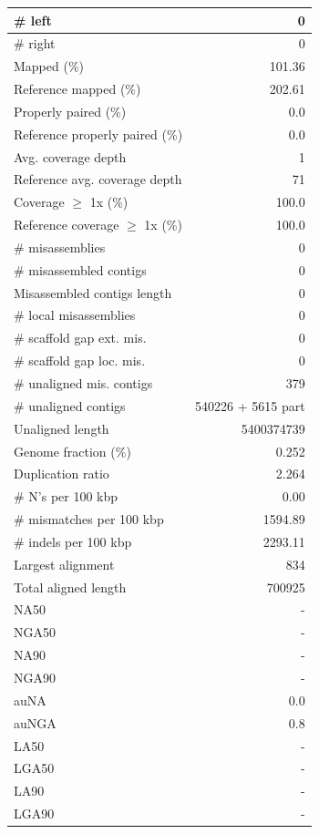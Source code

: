 \documentclass[12pt,a4paper]{article}
\begin{document}
\begin{table}[ht]
\begin{center}
\begin{tabular}{|l*{1}{|r}|}
\# left & 0 \\ \hline
\# right & 0 \\ \hline
Mapped (\%) & 101.36 \\ \hline
Reference mapped (\%) & 202.61 \\ \hline
Properly paired (\%) & 0.0 \\ \hline
Reference properly paired (\%) & 0.0 \\ \hline
Avg. coverage depth & 1 \\ \hline
Reference avg. coverage depth & 71 \\ \hline
Coverage $\geq$ 1x (\%) & 100.0 \\ \hline
Reference coverage $\geq$ 1x (\%) & 100.0 \\ \hline
\# misassemblies & 0 \\ \hline
\# misassembled contigs & 0 \\ \hline
Misassembled contigs length & 0 \\ \hline
\# local misassemblies & 0 \\ \hline
\# scaffold gap ext. mis. & 0 \\ \hline
\# scaffold gap loc. mis. & 0 \\ \hline
\# unaligned mis. contigs & 379 \\ \hline
\# unaligned contigs & 540226 + 5615 part \\ \hline
Unaligned length & 5400374739 \\ \hline
Genome fraction (\%) & 0.252 \\ \hline
Duplication ratio & 2.264 \\ \hline
\# N's per 100 kbp & 0.00 \\ \hline
\# mismatches per 100 kbp & 1594.89 \\ \hline
\# indels per 100 kbp & 2293.11 \\ \hline
Largest alignment & 834 \\ \hline
Total aligned length & 700925 \\ \hline
NA50 & - \\ \hline
NGA50 & - \\ \hline
NA90 & - \\ \hline
NGA90 & - \\ \hline
auNA & 0.0 \\ \hline
auNGA & 0.8 \\ \hline
LA50 & - \\ \hline
LGA50 & - \\ \hline
LA90 & - \\ \hline
LGA90 & - \\ \hline
\end{tabular}
\end{center}
\end{table}
\end{document}
